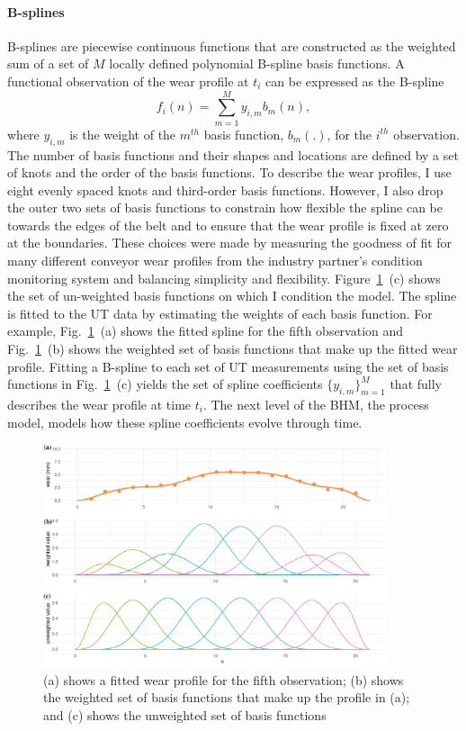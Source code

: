 \paragraph{B-splines}
B-splines are piecewise continuous functions \citep[p.~33-38]{ramsay_2009} that are constructed as the weighted sum of a set of $M$ locally defined polynomial B-spline basis functions. A functional observation of the wear profile at $t_i$ can be expressed as the B-spline
\begin{equation}
 f_i(n) = \sum_{m = 1}^{M} y_{i, m}b_m(n),
 \label{eq:spline}
\end{equation}
where $y_{i, m}$ is the weight of the $m^{th}$ basis function, $b_m(.)$, for the $i^{th}$ observation. The number of basis functions and their shapes and locations are defined by a set of knots and the order of the basis functions. To describe the wear profiles, I use eight evenly spaced knots and third-order basis functions. However, I also drop the outer two sets of basis functions to constrain how flexible the spline can be towards the edges of the belt and to ensure that the wear profile is fixed at zero at the boundaries. These choices were made by measuring the goodness of fit for many different conveyor wear profiles from the industry partner's condition monitoring system and balancing simplicity and flexibility. Figure~\ref{fig:basis-functions}~(c) shows the set of un-weighted basis functions on which I condition the model. The spline is fitted to the UT data by estimating the weights of each basis function. For example, Fig.~\ref{fig:basis-functions}~(a) shows the fitted spline for the fifth observation and Fig.~\ref{fig:basis-functions}~(b) shows the weighted set of basis functions that make up the fitted wear profile. Fitting a B-spline to each set of UT measurements using the set of basis functions in Fig.~\ref{fig:basis-functions}~(c) yields the set of spline coefficients $\{y_{i, m}\}^M_{m = 1}$ that fully describes the wear profile at time $t_i$. The next level of the BHM, the process model, models how these spline coefficients evolve through time.

\begin{figure}[h]
  \centering
  \includegraphics[width=0.9\textwidth]{figures/ch-6/b-spline-fitting.pdf}
  \caption{(a) shows a fitted wear profile for the fifth observation; (b) shows the weighted set of basis functions that make up the profile in (a); and (c) shows the unweighted set of basis functions}
  \label{fig:basis-functions}
\end{figure}

